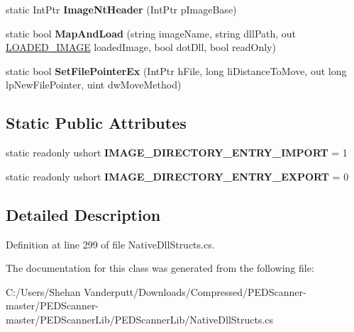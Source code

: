 \begin{DoxyCompactItemize}
static Int\+Ptr {\bfseries Image\+Nt\+Header} (Int\+Ptr p\+Image\+Base)
\item 
\mbox{\label{class_p_e_d_scanner_lib_1_1_struct_1_1_interop_aed20b693f14a56a0723ee148f189c8b2}} 
static bool {\bfseries Map\+And\+Load} (string image\+Name, string dll\+Path, out \mbox{\hyperlink{struct_p_e_d_scanner_lib_1_1_struct_1_1_l_o_a_d_e_d___i_m_a_g_e}{L\+O\+A\+D\+E\+D\+\_\+\+I\+M\+A\+GE}} loaded\+Image, bool dot\+Dll, bool read\+Only)
\item 
\mbox{\label{class_p_e_d_scanner_lib_1_1_struct_1_1_interop_acbb75464f4b2f6bc330be350a0ca3264}} 
static bool {\bfseries Set\+File\+Pointer\+Ex} (Int\+Ptr h\+File, long li\+Distance\+To\+Move, out long lp\+New\+File\+Pointer, uint dw\+Move\+Method)
\end{DoxyCompactItemize}
\subsection*{Static Public Attributes}
\begin{DoxyCompactItemize}
\item 
\mbox{\label{class_p_e_d_scanner_lib_1_1_struct_1_1_interop_ada7ee8624dc2e81e32215be6fe93f50d}} 
static readonly ushort {\bfseries I\+M\+A\+G\+E\+\_\+\+D\+I\+R\+E\+C\+T\+O\+R\+Y\+\_\+\+E\+N\+T\+R\+Y\+\_\+\+I\+M\+P\+O\+RT} = 1
\item 
\mbox{\label{class_p_e_d_scanner_lib_1_1_struct_1_1_interop_ad63757077050d2cb9bb0d4a15e2cf0fb}} 
static readonly ushort {\bfseries I\+M\+A\+G\+E\+\_\+\+D\+I\+R\+E\+C\+T\+O\+R\+Y\+\_\+\+E\+N\+T\+R\+Y\+\_\+\+E\+X\+P\+O\+RT} = 0
\end{DoxyCompactItemize}


\subsection{Detailed Description}


Definition at line 299 of file Native\+Dll\+Structs.\+cs.



The documentation for this class was generated from the following file\+:\begin{DoxyCompactItemize}
\item 
C\+:/\+Users/\+Shehan Vanderputt/\+Downloads/\+Compressed/\+P\+E\+D\+Scanner-\/master/\+P\+E\+D\+Scanner-\/master/\+P\+E\+D\+Scanner\+Lib/\+P\+E\+D\+Scanner\+Lib/Native\+Dll\+Structs.\+cs\end{DoxyCompactItemize}
